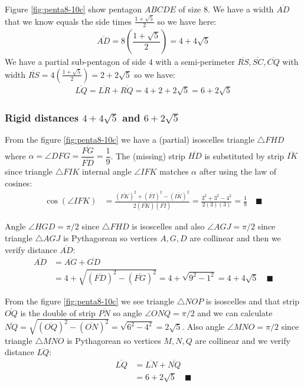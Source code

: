 \documentclass[11pt]{article}
\begin{document}
Figure \ref{fig:penta8-10c} show pentagon $ABCDE$ of size $8$. We have a width $\overline{AD}$ that we know equals the side times $\frac{1+\sqrt5}2$ so we have here:
\begin{align}
\overline{AD} = 8\left(\dfrac{1+\sqrt5}2\right) = 4 + 4\sqrt5
\end{align}
We have a partial sub-pentagon of side $4$ with a semi-perimeter $\overline{RS},\overline{SC},\overline{CQ}$ with width $\overline{RS} = 4\left(\frac{1+\sqrt5}2\right) = 2 + 2\sqrt5$ so we have:
\begin{align}
\overline{LQ} = \overline{LR} + \overline{RQ} = 4 + 2 + 2\sqrt5 = 6 + 2\sqrt5
\end{align}

\subsubsection{Rigid distances $4 + 4\sqrt5$ and $6 + 2\sqrt5$}

From the figure \ref{fig:penta8-10c} we have a (partial) isoscelles triangle $\triangle{FHD}$ where $\alpha = \angle{DFG} = \dfrac{\overline{FG}}{\overline{FD}} = \dfrac{1}9$. The (missing) strip $\overline{HD}$ is substituted by strip $\overline{IK}$ since triangle $\triangle{FIK}$ internal angle $\angle{IFK}$ matches $\alpha$ after using the law of cosines:
\begin{align}
\cos(\angle{IFK}) &= \frac{(\overline{FK})^2 + (\overline{FI})^2 - (\overline{IK})^2}
 {2(\overline{FK})(\overline{FI})} 
 = \frac{3^2 + 3^2 - 4^2}{2(3)(3)}
= \frac{1}9 \quad \blacksquare
\end{align}

Angle $\angle{HGD}= \pi / 2$ since $\triangle{FHD}$ is isoscelles and also $\angle{AGJ} = \pi / 2$ since triangle $\triangle{AGJ}$ is Pythagorean so vertices $A,G,D$ are collinear and then we verify distance $\overline{AD}$:
\begin{align}
\overline{AD} &= \overline{AG} + \overline{GD} \nonumber\\
 &= 4 + \sqrt{(\overline{FD})^2 - (\overline{FG})^2}
 = 4 + \sqrt{9^2 - 1^2} = 4 + 4\sqrt5 \quad \blacksquare
\end{align}

From the figure \ref{fig:penta8-10c} we see triangle $\triangle{NOP}$ is isoscelles and that strip $\overline{OQ}$ is the double of strip $\overline{PN}$ so angle $\angle{ONQ} = \pi / 2$ and we can calculate $\overline{NQ} = \sqrt{(\overline{OQ})^2 - (\overline{ON})^2} = \sqrt{6^2 - 4^2} = 2\sqrt5$. Also angle $\angle{MNO} = \pi / 2$ since triangle $\triangle{MNO}$ is Pythagorean so vertices $M,N,Q$ are collinear and we verify distance $\overline{LQ}$:
\begin{align}
\overline{LQ} &= \overline{LN} + \overline{NQ} \nonumber\\
 &= 6 + 2\sqrt5 \quad \blacksquare
\end{align}
\end{document}

